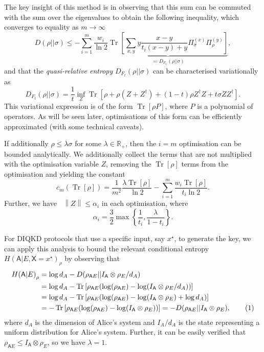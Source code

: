 \documentclass[10pt, a4paper]{article}
\numberwithin{equation}{section} %
\theoremstyle{definition}
\theoremstyle{plain}
\newcommand{\usenumber}{%
  \refstepcounter{equation}\tag{\theequation}
}
\newcommand{\norm}[1]{\mathop{}\left\lVert#1\right\rVert}
\newcommand{\?}{\mathrel{?}} %
\newcommand{\R}{\mathbb{R}} %
\newcommand{\Tr}[2][]{\mathop{\mathrm{Tr}#1}\left[ #2 \right]} %
\newcommand{\crv}[1]{\mathsf{#1}}
\begin{document}
    The key insight of this method is in observing that this sum can be commuted with the sum over the eigenvalues to obtain the following inequality, which converges to equality as \(m\to\infty\)
    \begin{equation}
      D(\rho||\sigma) \leq - \sum_{i=1}^{m} \frac{w_i}{\ln 2} \underbrace{\Tr{ \sum_{x,y} y \frac{x-y}{t_i(x-y)+y} \Pi^{(x)}_{\sigma} \Pi^{(y)}_{\rho} }}_{\eqqcolon D_{F_{t_i}}(\rho||\sigma)},\label{eqn:re_from_qre}
    \end{equation}
    and that the \emph{quasi-relative entropy} \(D_{F_{t}}(\rho||\sigma)\) can be characterised variationally as
    \begin{equation}
      D_{F_{t}}(\rho||\sigma) = \frac{1}{t} \inf_Z \Tr{ \rho + \rho(Z + Z^{\dagger}) + (1-t)\rho{}Z^{\dagger}Z + t\sigma{}ZZ^{\dagger} }.\label{eqn:qre_var}
    \end{equation}
    This variational expression is of the form \(\Tr{\rho P}\), where \(P\) is a polynomial of operators. As will be seen later, optimisations of this form can be efficiently approximated (with some technical caveats).

    If additionally \(\rho \leq \lambda\sigma\) for some \(\lambda \in \R_+\), then the \(i=m\) optimisation can be bounded analytically. We additionally collect the terms that are not multiplied with the optimisation variable \(Z\), removing the \(\Tr{\rho}\) terms from the optimisation and yielding the constant
    \begin{equation}
      c_m(\Tr{\rho}) = \frac{1}{m^2} \frac{\lambda \Tr{\rho}}{\ln 2} - \sum_{i=1}^m \frac{w_i \Tr{\rho}}{t_i \ln 2}.
    \end{equation}
    Further, we have \(\norm{Z} \leq \alpha_i\) in each optimisation, where
    \begin{equation}\label{eqn:qre_bound}
      \alpha_i = \frac{3}{2} \max\left\{\frac{1}{t_i}, \frac{\lambda}{1-t_i}\right\}.
    \end{equation}

    For DIQKD protocols that use a specific input, say \(x^{\star}\), to generate the key, we can apply this analysis to bound the relevant conditional entropy \(H{(\crv{A}|E, \crv{X}=x^{\star})}_{\rho}\) by observing that
    \begin{align*}
      H{(\crv{A}|E)}_{\rho} &= \log d_A - D(\rho_{\crv{A}E}||I_{\crv{A}}\otimes\rho_{E} / d_A) \\
                            &= \log d_A - \Tr{\rho_{\crv{A}E}(\log(\rho_{\crv{A}E}) - \log(I_{\crv{A}}\otimes\rho_{E} / d_A))} \\
                            &= \log d_A - \Tr{\rho_{\crv{A}E}(\log(\rho_{\crv{A}E}) - \log(I_{\crv{A}}\otimes\rho_{E}) + \log d_A)} \\
                            &= -\Tr{\rho_{\crv{A}E}(\log(\rho_{\crv{A}E}) - \log(I_{\crv{A}}\otimes\rho_{E}))} = -D(\rho_{\crv{A}E}||I_{\crv{A}}\otimes\rho_{E}), \usenumber
    \end{align*}
    where \(d_A\) is the dimension of Alice's system and \(I_A/d_A\) is the state representing a uniform distribution for Alice's system. Further, it can be easily verified that \(\rho_{\crv{A}E} \leq I_{\crv{A}} \otimes \rho_{E}\), so we have \(\lambda = 1\).
\end{document}
